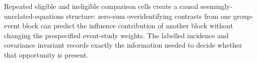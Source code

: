 Repeated eligible and ineligible comparison cells create a causal seemingly-unrelated-equations structure: zero-sum overidentifying contrasts from one group-event block can predict the influence contribution of another block without changing the prespecified event-study weights. The labelled incidence and covariance invariant records exactly the information needed to decide whether that opportunity is present.